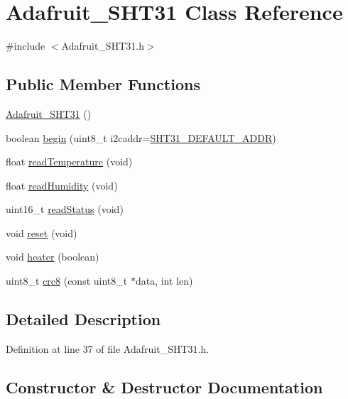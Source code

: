 \hypertarget{class_adafruit___s_h_t31}{}\section{Adafruit\+\_\+\+S\+H\+T31 Class Reference}
\label{class_adafruit___s_h_t31}


{\ttfamily \#include $<$Adafruit\+\_\+\+S\+H\+T31.\+h$>$}

\subsection*{Public Member Functions}
\begin{DoxyCompactItemize}
\item 
\hyperlink{class_adafruit___s_h_t31_a3c675ce344f1dd28b04764de3d7b5104}{Adafruit\+\_\+\+S\+H\+T31} ()
\item 
boolean \hyperlink{class_adafruit___s_h_t31_a104eb2dfd27a732420e1fc3755516690}{begin} (uint8\+\_\+t i2caddr=\hyperlink{_adafruit___s_h_t31_8h_a126bb81a04ac54c61287dd2b106bbfe2}{S\+H\+T31\+\_\+\+D\+E\+F\+A\+U\+L\+T\+\_\+\+A\+D\+DR})
\item 
float \hyperlink{class_adafruit___s_h_t31_a3b518218705509eb0ab35050bf79f00a}{read\+Temperature} (void)
\item 
float \hyperlink{class_adafruit___s_h_t31_a2b522bec65225d5c2aadfccd31bb91e0}{read\+Humidity} (void)
\item 
uint16\+\_\+t \hyperlink{class_adafruit___s_h_t31_ae41f7910027c9a39afdb11aef45742ab}{read\+Status} (void)
\item 
void \hyperlink{class_adafruit___s_h_t31_a4cfa42c7211e1c5c3de411f3b099c827}{reset} (void)
\item 
void \hyperlink{class_adafruit___s_h_t31_a96d0021ed52302e3a47fd2eaa6c1282f}{heater} (boolean)
\item 
uint8\+\_\+t \hyperlink{class_adafruit___s_h_t31_a9fe74b3c5be1794ec00a961d91227716}{crc8} (const uint8\+\_\+t $\ast$data, int len)
\end{DoxyCompactItemize}


\subsection{Detailed Description}


Definition at line 37 of file Adafruit\+\_\+\+S\+H\+T31.\+h.



\subsection{Constructor \& Destructor Documentation}
